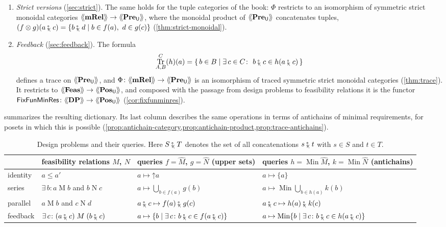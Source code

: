 \documentclass[11pt,a4paper]{article}
\theoremstyle{plain}
\theoremstyle{definition}
\theoremstyle{remark}
\newcommand{\Cat}[1]{\mathbf{#1}}
\newcommand{\Pre}{\Cat{Pre}}
\newcommand{\Pos}{\Cat{Pos}}
\newcommand{\mRel}{\Cat{mRel}}
\newcommand{\Feas}{\Cat{Feas}}
\newcommand{\DP}{\Cat{DP}}
\newcommand{\U}{\mathsf{U}}
\newcommand{\PreU}{\Pre_{\U}}
\newcommand{\PosU}{\Pos_{\U}}
\providecommand{\llangle}{\mathopen{\langle\mkern-3.5mu\langle}}
\providecommand{\rrangle}{\mathclose{\rangle\mkern-3.5mu\rangle}}
\newcommand{\tL}[1]{\llangle #1 \rrangle}
\newcommand{\tc}{\mathbin{\fatsemi_{\!\scriptscriptstyle\langle}}}
\newcommand{\rel}[3]{#1 \mathrel{#2} #3}
\newcommand{\up}{\mathord{\uparrow}}
\DeclareMathOperator{\Min}{Min}
\DeclareMathOperator{\Tr}{Tr}
\newcommand{\Fix}{\mathsf{FixFunMinRes}}
\begin{document}
\begin{enumerate}[leftmargin=2em]
          With these structures, $\Phi$ is an isomorphism of symmetric monoidal categories (\cref{thm:PreU-monoidal}).
    \item \emph{Strict versions} (\cref{sec:strict}).
          The same holds for the tuple categories of the book: $\Phi$ restricts to an isomorphism of symmetric strict monoidal categories $\tL{\mRel} \to \tL{\PreU}$, where the monoidal product of $\tL{\PreU}$ concatenates tuples, $(f \otimes g)(a \tc c) = \{ b \tc d \mid b \in f(a),\ d \in g(c) \}$ (\cref{thm:strict-monoidal}).
    \item \emph{Feedback} (\cref{sec:feedback}).
          The formula
          \begin{equation*}
              \Tr^{C}_{A,B}(h)(a) = \{\, b \in B \mid \exists\, c \in C \colon\ b \tc c \in h(a \tc c) \,\}
          \end{equation*}
          defines a trace on $\tL{\PreU}$, and $\Phi \colon \tL{\mRel} \to \tL{\PreU}$ is an isomorphism of traced symmetric strict monoidal categories (\cref{thm:trace}).
          It restricts to $\tL{\Feas} \to \tL{\PosU}$, and composed with the passage from design problems to feasibility relations it is the functor $\Fix \colon \tL{\DP} \to \tL{\PosU}$ (\cref{cor:fixfunminres}).
\end{enumerate}

 summarizes the resulting dictionary.
Its last column describes the same operations in terms of antichains of minimal requirements, for posets in which this is possible (\cref{prop:antichain-category,prop:antichain-product,prop:trace-antichains}).

\begin{table}[ht]
    \centering
    \small
    \renewcommand{\arraystretch}{1.5}
    \begin{tabular}{@{}p{14mm}p{40mm}p{45mm}p{47mm}@{}}
        \toprule
                 & feasibility relations $M$, $N$ & queries $f = \widehat{M}$, $g = \widehat{N}$ (upper sets) & queries $h = \Min \widehat{M}$, $k = \Min \widehat{N}$ (antichains) \\
        \midrule
        identity & $a \leq a'$ & $a \mapsto \up a$ & $a \mapsto \{a\}$ \\
        series   & $\exists\, b \colon \rel{a}{M}{b}$ and $\rel{b}{N}{c}$ & $a \mapsto \bigcup_{b \in f(a)} g(b)$ & $a \mapsto \Min \bigcup_{b \in h(a)} k(b)$ \\
        parallel & $\rel{a}{M}{b}$ and $\rel{c}{N}{d}$ & $a \tc c \mapsto f(a) \tc g(c)$ & $a \tc c \mapsto h(a) \tc k(c)$ \\
        feedback & $\exists\, c \colon \rel{(a \tc c)}{M}{(b \tc c)}$ & $a \mapsto \{ b \mid \exists\, c \colon b \tc c \in f(a \tc c) \}$ & $a \mapsto \Min \{ b \mid \exists\, c \colon b \tc c \in h(a \tc c) \}$ \\
        \bottomrule
    \end{tabular}
    \caption{Design problems and their queries. Here $S \tc T$ denotes the set of all concatenations $s \tc t$ with $s \in S$ and $t \in T$.}
    \label{tab:dictionary}
\end{table}
\end{document}
